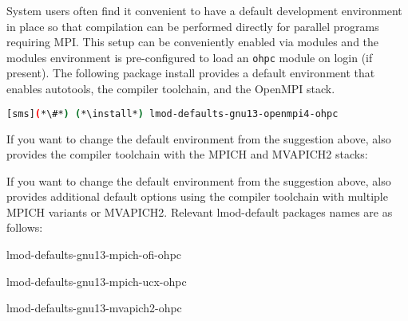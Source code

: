 System users often find it convenient to have a default development environment
in place so that compilation can be performed directly for parallel programs
requiring MPI. This setup can be conveniently enabled via modules and the \OHPC{}
modules environment is pre-configured to load an \texttt{ohpc} module on login
(if present). The following package install provides a default
environment that enables autotools, the \GNU{} compiler toolchain, and the
OpenMPI stack.

\begin{lstlisting}[language=bash]
[sms](*\#*) (*\install*) lmod-defaults-gnu13-openmpi4-ohpc
\end{lstlisting}

\begin{center}
\begin{tcolorbox}[]
\small
{}
If you want to change the default environment from the suggestion above, \OHPC{}
also provides the \GNU{} compiler toolchain with the MPICH and MVAPICH2 stacks:
\fi

If you want to change the default environment from the suggestion above, \OHPC{}
also provides additional default options using the \GNU{} compiler toolchain
with multiple MPICH variants or MVAPICH2. Relevant lmod-default packages names
are as follows:
\fi

\begin{itemize*}
\item lmod-defaults-gnu13-mpich-ofi-ohpc
\item lmod-defaults-gnu13-mpich-ucx-ohpc
\item lmod-defaults-gnu13-mvapich2-ohpc
\fi
\end{itemize*}
\end{tcolorbox}
\end{center}
